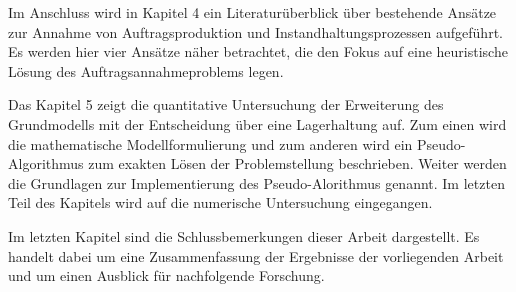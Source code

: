 Im Anschluss wird in Kapitel 4 ein Literaturüberblick über bestehende Ansätze zur Annahme von Auftragsproduktion und Instandhaltungsprozessen aufgeführt. Es werden hier vier Ansätze näher betrachtet, die den Fokus auf eine heuristische Lösung des Auftragsannahmeproblems legen.

Das Kapitel 5 zeigt die quantitative Untersuchung der Erweiterung des Grundmodells mit der Entscheidung über eine Lagerhaltung auf. Zum einen wird die  mathematische Modellformulierung und zum anderen wird ein Pseudo-Algorithmus zum exakten Lösen der Problemstellung beschrieben. Weiter werden die Grundlagen zur Implementierung des Pseudo-Alorithmus genannt. Im letzten Teil des Kapitels wird auf die numerische Untersuchung eingegangen.

Im letzten Kapitel sind die Schlussbemerkungen dieser Arbeit dargestellt. Es handelt dabei um eine Zusammenfassung der Ergebnisse der vorliegenden Arbeit und um einen Ausblick für nachfolgende Forschung.